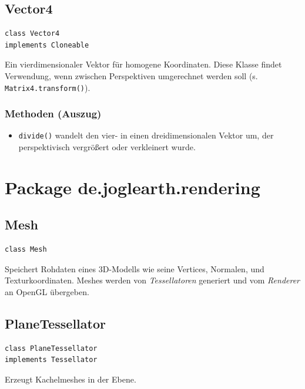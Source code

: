 \documentclass[10pt]{scrreprt}
\begin{document}
\vspace{5mm}
\subsection*{Vector4}
\begin{lstlisting}
class Vector4
implements Cloneable
\end{lstlisting}
Ein vierdimensionaler Vektor für homogene Koordinaten. Diese Klasse findet Verwendung, wenn zwischen Perspektiven umgerechnet werden soll (s. \texttt{Matrix4.transform()}).\\
\subsubsection*{Methoden (Auszug)}
\begin{itemize}
\item \texttt{divide()} wandelt den vier- in einen dreidimensionalen Vektor um, der perspektivisch vergrößert oder verkleinert wurde.
\end{itemize}





\vspace{5mm}
\section{Package de.joglearth.rendering}
\subsection*{Mesh}
\begin{lstlisting}
class Mesh
\end{lstlisting}
Speichert Rohdaten eines 3D-Modells wie seine Vertices, Normalen, und Texturkoordinaten. Meshes werden von \textit{Tessellatoren} generiert und vom \textit{Renderer} an OpenGL übergeben.\\

\vspace{5mm}
\subsection*{PlaneTessellator}
\begin{lstlisting}
class PlaneTessellator
implements Tessellator
\end{lstlisting}
Erzeugt Kachelmeshes in der Ebene.\\

\vspace{5mm}
\end{document}

